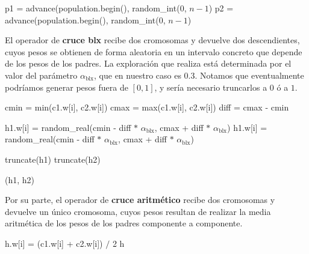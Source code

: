 \documentclass[12pt]{article}
\begin{document}
\begin{algorithm}[h!]
\begin{algorithmic}

    \State p1 = advance(population.begin(), random\_int($0$, $n-1$)  
    \State p2 = advance(population.begin(), random\_int($0$, $n-1$)
    \State {}
\EndFunction

\end{algorithmic}
\end{algorithm}

El operador de \textbf{cruce blx} recibe dos cromosomas y devuelve dos descendientes, cuyos pesos se obtienen de forma aleatoria en un intervalo concreto que depende de los pesos de los padres. La exploración que realiza está determinada por el valor del parámetro $\alpha_{\text{blx}}$, que en nuestro caso es $0.3$. Notamos que eventualmente podríamos generar pesos fuera de $[0,1]$, y sería necesario truncarlos a $0$ ó a $1$.

\begin{algorithm}[ht]
\begin{algorithmic}

      
        \State cmin = min(c1.w[i], c2.w[i])
        \State cmax = max(c1.w[i], c2.w[i])
        \State diff = cmax - cmin
        
        \State h1.w[i] = random\_real(cmin - diff $\ast$ $\alpha_{\text{blx}}$, cmax + diff $\ast$ $\alpha_{\text{blx}}$)
        \State h1.w[i] = random\_real(cmin - diff $\ast$ $\alpha_{\text{blx}}$, cmax + diff $\ast$ $\alpha_{\text{blx}}$)
        
        \State truncate(h1)
        \State truncate(h2)
    \EndFor
    
    \State \Return (h1, h2)
\EndFunction

\end{algorithmic}
\end{algorithm}

Por su parte, el operador de \textbf{cruce aritmético} recibe dos cromosomas y devuelve un único cromosoma, cuyos pesos resultan de realizar la media aritmética de los pesos de los padres componente a componente.\\

\begin{algorithm}[ht!]
\begin{algorithmic}

      
        \State h.w[i] = (c1.w[i] + c2.w[i]) $/$ 2
    \EndFor
    \State \Return h
\EndFunction

\end{algorithmic}
\end{algorithm}
\end{document}

